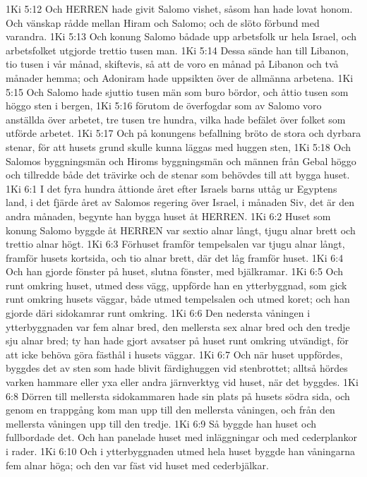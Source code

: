 1Ki 5:12  Och HERREN hade givit Salomo vishet, såsom han hade lovat honom. Och vänskap rådde mellan Hiram och Salomo; och de slöto förbund med varandra.
1Ki 5:13  Och konung Salomo bådade upp arbetsfolk ur hela Israel, och arbetsfolket utgjorde trettio tusen man.
1Ki 5:14  Dessa sände han till Libanon, tio tusen i vår månad, skiftevis, så att de voro en månad på Libanon och två månader hemma; och Adoniram hade uppsikten över de allmänna arbetena.
1Ki 5:15  Och Salomo hade sjuttio tusen män som buro bördor, och åttio tusen som höggo sten i bergen,
1Ki 5:16  förutom de överfogdar som av Salomo voro anställda över arbetet, tre tusen tre hundra, vilka hade befälet över folket som utförde arbetet.
1Ki 5:17  Och på konungens befallning bröto de stora och dyrbara stenar, för att husets grund skulle kunna läggas med huggen sten,
1Ki 5:18  Och Salomos byggningsmän och Hiroms byggningsmän och männen från Gebal höggo och tillredde både det trävirke och de stenar som behövdes till att bygga huset.
1Ki 6:1  I det fyra hundra åttionde året efter Israels barns uttåg ur Egyptens land, i det fjärde året av Salomos regering över Israel, i månaden Siv, det är den andra månaden, begynte han bygga huset åt HERREN.
1Ki 6:2  Huset som konung Salomo byggde åt HERREN var sextio alnar långt, tjugu alnar brett och trettio alnar högt.
1Ki 6:3  Förhuset framför tempelsalen var tjugu alnar långt, framför husets kortsida, och tio alnar brett, där det låg framför huset.
1Ki 6:4  Och han gjorde fönster på huset, slutna fönster, med bjälkramar.
1Ki 6:5  Och runt omkring huset, utmed dess vägg, uppförde han en ytterbyggnad, som gick runt omkring husets väggar, både utmed tempelsalen och utmed koret; och han gjorde däri sidokamrar runt omkring.
1Ki 6:6  Den nedersta våningen i ytterbyggnaden var fem alnar bred, den mellersta sex alnar bred och den tredje sju alnar bred; ty han hade gjort avsatser på huset runt omkring utvändigt, för att icke behöva göra fästhål i husets väggar.
1Ki 6:7  Och när huset uppfördes, byggdes det av sten som hade blivit färdighuggen vid stenbrottet; alltså hördes varken hammare eller yxa eller andra järnverktyg vid huset, när det byggdes.
1Ki 6:8  Dörren till mellersta sidokammaren hade sin plats på husets södra sida, och genom en trappgång kom man upp till den mellersta våningen, och från den mellersta våningen upp till den tredje.
1Ki 6:9  Så byggde han huset och fullbordade det. Och han panelade huset med inläggningar och med cederplankor i rader.
1Ki 6:10  Och i ytterbyggnaden utmed hela huset byggde han våningarna fem alnar höga; och den var fäst vid huset med cederbjälkar.
